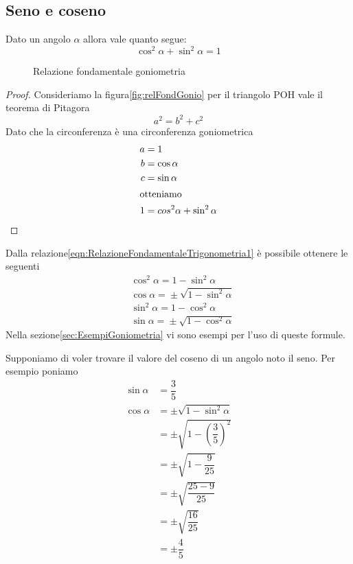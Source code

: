 \subsection{Seno e coseno}
\label{sec:RelazioniFondamentaliSenoCoseno}
\begin{teorema}
Dato un angolo $\alpha$ allora vale quanto segue:
\begin{equation*}
\cos^2\alpha+\sin^2\alpha=1\label{eqn:RelazioneFondamentaleTrigonometria1}
\end{equation*}
\end{teorema}
\begin{figure}
	\centering
	
\caption{Relazione fondamentale goniometria}
\label{fig:relFondGonio}
\end{figure}
\begin{proof}
	Consideriamo la figura\nobs\vref{fig:relFondGonio} per il triangolo POH vale il teorema di Pitagora \[a^2=b^2+c^2\] Dato che la circonferenza è una circonferenza goniometrica
	\begin{align*}
	a&=1\\
	b&=\cos\alpha\\
	c&=\sin\alpha\\
	\intertext{otteniamo}
	1&=cos^2\alpha+\sin^2\alpha\\
	\end{align*}
\end{proof}
Dalla relazione\nobs\vref{eqn:RelazioneFondamentaleTrigonometria1} è possibile ottenere le seguenti
\begin{align*}
&\cos^{2}\alpha={}1-\sin^{2}\alpha\\
&\cos\alpha={}\pm\sqrt{1-\sin^{2}\alpha}\\
&\sin^{2}\alpha={}1-\cos^{2}\alpha \\
&\sin\alpha={}\pm\sqrt{1-\cos^{2}\alpha}
\end{align*}
Nella sezione\nobs\vref{sec:EsempiGoniometria} vi sono esempi per l'uso di queste formule. 
\begin{esempio}
Supponiamo di voler trovare il valore del coseno di un angolo noto il seno. Per esempio poniamo 
\begin{align*}
\sin\alpha&{}=\dfrac{3}{5}\\
\cos\alpha&=\pm\sqrt{1-\sin^2\alpha}\\
&=\pm\sqrt{1-\left(\dfrac{3}{5}\right)^2}\\
&=\pm\sqrt{1-\dfrac{9}{25}}\\
&=\pm\sqrt{\dfrac{25-9}{25}}\\
&=\pm\sqrt{\dfrac{16}{25}} \\
&=\pm\dfrac{4}{5} 
\end{align*}
\end{esempio}
